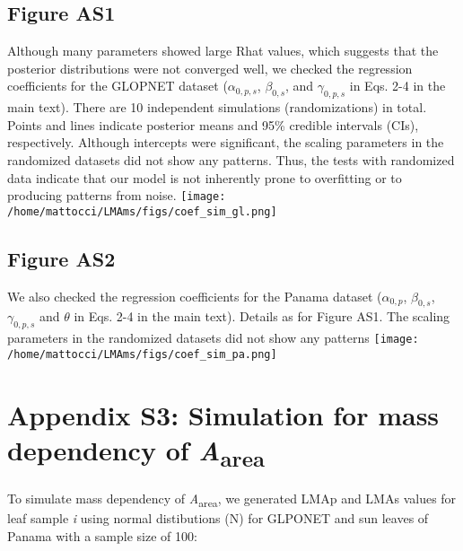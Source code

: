 \documentclass[
  12pt,
  letterpaper,
  DIV=11,
  numbers=noendperiod]{scrartcl}
\begin{document}
\newpage

\hypertarget{figure-as1}{%
\subsection{Figure AS1}\label{figure-as1}}

Although many parameters showed large Rhat values, which suggests that
the posterior distributions were not converged well, we checked the
regression coefficients for the GLOPNET dataset (\(\alpha_{0, p, s}\),
\(\beta_{0, s}\), and \(\gamma_{0, p, s}\) in Eqs. 2-4 in the main
text). There are 10 independent simulations (randomizations) in total.
Points and lines indicate posterior means and 95\% credible intervals
(CIs), respectively. Although intercepts were significant, the scaling
parameters in the randomized datasets did not show any patterns. Thus,
the tests with randomized data indicate that our model is not inherently
prone to overfitting or to producing patterns from noise.
\texttt{[image: /home/mattocci/LMAms/figs/coef\_sim\_gl.png]}

\newpage

\hypertarget{figure-as2}{%
\subsection{Figure AS2}\label{figure-as2}}

We also checked the regression coefficients for the Panama dataset
(\(\alpha_{0, p}\), \(\beta_{0, s}\), \(\gamma_{0, p, s}\) and
\(\theta\) in Eqs. 2-4 in the main text). Details as for Figure AS1. The
scaling parameters in the randomized datasets did not show any patterns
\texttt{[image: /home/mattocci/LMAms/figs/coef\_sim\_pa.png]}

\newpage

\hypertarget{appendix-s3-simulation-for-mass-dependency-of-aarea}{%
\section{\texorpdfstring{Appendix S3: Simulation for mass dependency of
\emph{A}\textsubscript{area}}{Appendix S3: Simulation for mass dependency of Aarea}}\label{appendix-s3-simulation-for-mass-dependency-of-aarea}}

To simulate mass dependency of \emph{A}\textsubscript{area}, we
generated LMAp and LMAs values for leaf sample \emph{i} using normal
distibutions (N) for GLPONET and sun leaves of Panama with a sample size
of 100:
\end{document}
